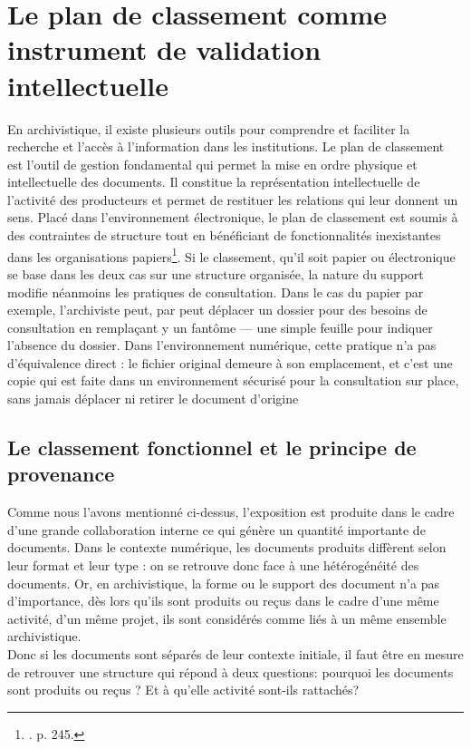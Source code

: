 \section{ Le plan de classement comme instrument de validation intellectuelle}

En archivistique, il existe plusieurs outils pour comprendre et faciliter la recherche et l'accès à l'information dans les institutions. Le plan de classement est l'outil de gestion fondamental qui permet la mise en ordre physique et intellectuelle des documents. Il constitue la représentation intellectuelle de l'activité des producteurs et permet de restituer les relations qui leur donnent un sens. Placé dans l'environnement électronique, le plan de classement est soumis à des contraintes de structure tout en bénéficiant de fonctionnalités inexistantes dans les organisations papiers\footnote{\cite{collet2012}. p. 245.}. Si le classement, qu'il soit papier ou électronique se base dans les deux cas sur une structure organisée, la nature du support modifie néanmoins les pratiques de consultation. Dans le cas du papier par exemple, l'archiviste peut, par peut déplacer un dossier pour des besoins de consultation en remplaçant y un fantôme — une simple feuille pour indiquer l'absence du dossier. Dans l'environnement numérique, cette pratique n'a pas d'équivalence direct : le fichier original demeure à son emplacement, et c'est une copie qui est faite dans un environnement sécurisé pour la consultation sur place, sans jamais déplacer ni retirer le document d'origine

\subsection*{Le classement fonctionnel et le principe de provenance}

Comme nous l'avons mentionné ci-dessus, l’exposition est produite dans le cadre d’une grande collaboration interne ce qui génère un quantité importante de documents. Dans le contexte numérique, les documents produits diffèrent selon leur format et leur type : on se retrouve donc face à une hétérogénéité des documents. Or, en archivistique, la forme ou le support des document n'a pas d'importance, dès lors qu'ils sont produits ou reçus dans le cadre d'une même activité, d'un même projet, ils sont considérés comme liés à un même ensemble archivistique.\\[0.1cm]

Donc si les documents sont séparés de leur contexte initiale, il faut être en mesure de retrouver une structure qui répond à deux questions: pourquoi les documents sont produits ou reçus ? Et à qu'elle activité sont-ils rattachés? \\[0.2cm]

